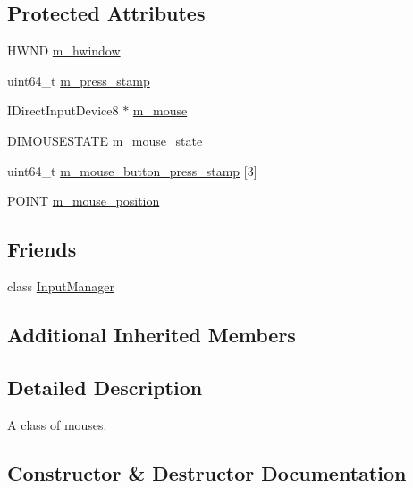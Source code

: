 \subsection*{Protected Attributes}
\begin{DoxyCompactItemize}
\item 
H\+W\+ND \hyperlink{classmage_1_1_mouse_a0c67906df7b8b0cce013c724be4625ac}{m\+\_\+hwindow}
\item 
uint64\+\_\+t \hyperlink{classmage_1_1_mouse_a32b30d3c37a2082869f4ff4f522dfbf8}{m\+\_\+press\+\_\+stamp}
\item 
I\+Direct\+Input\+Device8 $\ast$ \hyperlink{classmage_1_1_mouse_a873713cdf019671a94952d88faeb2b7a}{m\+\_\+mouse}
\item 
D\+I\+M\+O\+U\+S\+E\+S\+T\+A\+TE \hyperlink{classmage_1_1_mouse_af99645fb4226077abee4532a5e663066}{m\+\_\+mouse\+\_\+state}
\item 
uint64\+\_\+t \hyperlink{classmage_1_1_mouse_a0f5a38e23bdf7eae1b7b1030a53edff0}{m\+\_\+mouse\+\_\+button\+\_\+press\+\_\+stamp} \mbox{[}3\mbox{]}
\item 
P\+O\+I\+NT \hyperlink{classmage_1_1_mouse_a2a8332ef7a4daa0f9ed48a9a1ad80684}{m\+\_\+mouse\+\_\+position}
\end{DoxyCompactItemize}
\subsection*{Friends}
\begin{DoxyCompactItemize}
\item 
class \hyperlink{classmage_1_1_mouse_af0e8c3dcc20b7ddcaf63506363a22821}{Input\+Manager}
\end{DoxyCompactItemize}
\subsection*{Additional Inherited Members}


\subsection{Detailed Description}
A class of mouses. 

\subsection{Constructor \& Destructor Documentation}
\hypertarget{classmage_1_1_mouse_ad02365977dab44603400ac6f24e0df97}{}\label{classmage_1_1_mouse_ad02365977dab44603400ac6f24e0df97} 
